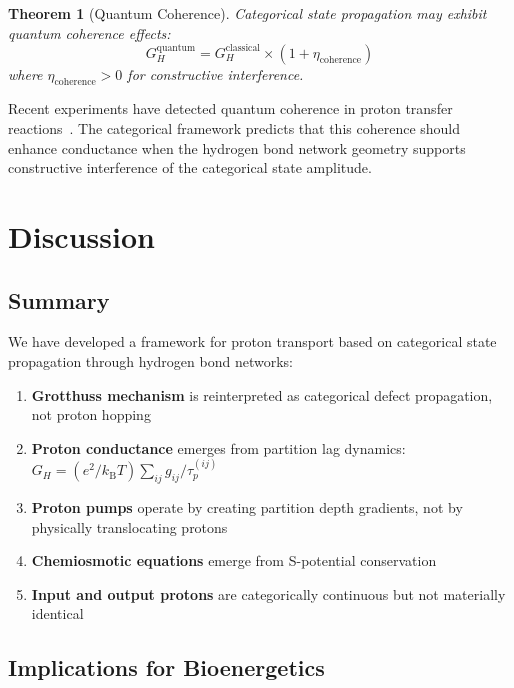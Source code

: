 \documentclass[twocolumn,showpacs,preprintnumbers,amsmath,amssymb,prd]{revtex4-2}
\newtheorem{theorem}{Theorem}[section]
\newcommand{\taup}{\tau_p}
\newcommand{\kB}{k_{\text{B}}}
\begin{document}
\begin{theorem}[Quantum Coherence]
\label{thm:quantum}
Categorical state propagation may exhibit quantum coherence effects:
\begin{equation}
G_H^{\text{quantum}} = G_H^{\text{classical}} \times \left(1 + \eta_{\text{coherence}}\right)
\label{eq:quantum_enhancement}
\end{equation}
where $\eta_{\text{coherence}} > 0$ for constructive interference.
\end{theorem}

Recent experiments have detected quantum coherence in proton transfer reactions~\cite{Scholes2017}. The categorical framework predicts that this coherence should enhance conductance when the hydrogen bond network geometry supports constructive interference of the categorical state amplitude.


\section{Discussion}
\label{sec:discussion}

\subsection{Summary}

We have developed a framework for proton transport based on categorical state propagation through hydrogen bond networks:

\begin{enumerate}
\item \textbf{Grotthuss mechanism} is reinterpreted as categorical defect propagation, not proton hopping

\item \textbf{Proton conductance} emerges from partition lag dynamics: $G_H = (e^2/\kB T)\sum_{ij}g_{ij}/\taup^{(ij)}$

\item \textbf{Proton pumps} operate by creating partition depth gradients, not by physically translocating protons

\item \textbf{Chemiosmotic equations} emerge from S-potential conservation

\item \textbf{Input and output protons} are categorically continuous but not materially identical
\end{enumerate}

\subsection{Implications for Bioenergetics}
\end{document}

